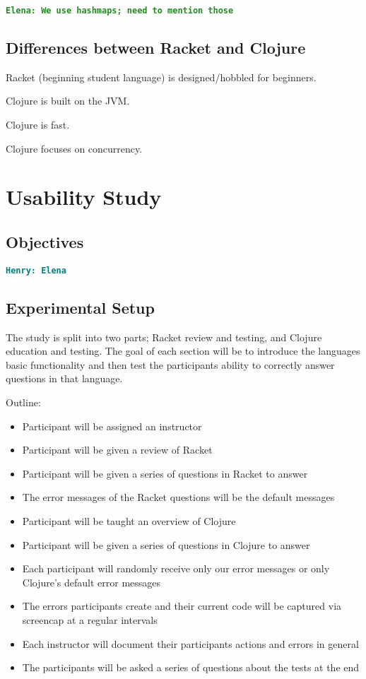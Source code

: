 \documentclass[12pt]{article}
\newcommand{\comment}[1]{{\bf \tt  {#1}}}
\newcommand{\emcomment}[1]{\textcolor{ForestGreen}{\comment{Elena: {#1}}}}
\newcommand{\hfcomment}[1]{\textcolor{Teal}{\comment{Henry: {#1}}}}
\begin{document}
\emcomment{We use hashmaps; need to mention those}
	\subsection{Differences between Racket and Clojure}\label{sec:diff}

Racket (beginning student language) is designed/hobbled for beginners.

Clojure is built on the JVM.

Clojure is fast.

Clojure focuses on concurrency.
\section{Usability Study}\label{sec:study}
	\subsection{Objectives}\label{sec:obj}
	\hfcomment{Elena}
	\subsection{Experimental Setup}\label{sec:setup}

The study is split into two parts; Racket review and testing, and Clojure education and testing.
The goal of each section will be to introduce the languages basic functionality and then test the participants ability to correctly answer questions in that language.

Outline:
\begin{itemize}
\item Participant will be assigned an instructor
\item Participant will be given a review of Racket
\item Participant will be given a series of questions in Racket to answer
\item The error messages of the Racket questions will be the default messages
\item Participant will be taught an overview of Clojure
\item Participant will be given a series of questions in Clojure to answer
\item Each participant will randomly receive only our error messages or  only Clojure's default error messages
\item The errors participants create and their current code will be captured via screencap at a regular intervals
\item Each instructor will document their participants actions and errors in general
\item The participants will be asked a series of questions about the tests at the end
\end{itemize}
\end{document}
